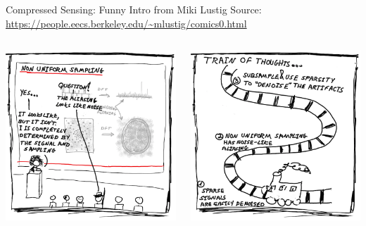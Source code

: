 \documentclass[aspectratio=169]{beamer}
\begin{document}
	\begin{frame}{Compressed Sensing: Funny Intro from Miki Lustig}
		Source: \url{https://people.eecs.berkeley.edu/~mlustig/comics0.html}
		\vspace{1em}
		\begin{columns}
			\centering
			\includegraphics[width=\columnwidth]{figures/cs-lustig-comics-17.png}
			
			\centering
			\includegraphics[width=\columnwidth]{figures/cs-lustig-comics-18.png}
		\end{columns}
	\end{frame}
	
\end{document}
